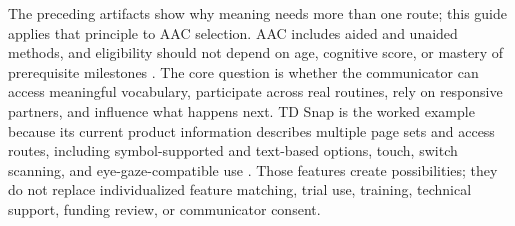 
\vspace{-0.5cm}

The preceding artifacts show why meaning needs more than one route; this guide applies that principle to AAC selection. AAC includes aided and unaided methods, and eligibility should not depend on age, cognitive score, or mastery of prerequisite milestones \citep{ashaAAC,mirenda2015aids}. The core question is whether the communicator can access meaningful vocabulary, participate across real routines, rely on responsive partners, and influence what happens next. TD Snap is the worked example because its current product information describes multiple page sets and access routes, including symbol-supported and text-based options, touch, switch scanning, and eye-gaze-compatible use \citep{tobii2026tdsnap}. Those features create possibilities; they do not replace individualized feature matching, trial use, training, technical support, funding review, or communicator consent.

